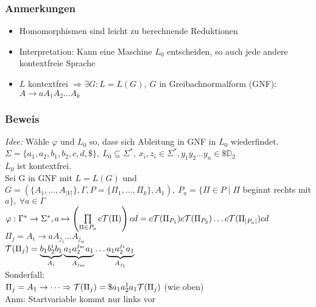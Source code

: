         \subsubsection{Anmerkungen}
            \begin{itemize}
                \item Homomorphismen sind leicht zu berechnende Reduktionen
                \item Interpretation: Kann eine Maschine $L_0$ entscheiden, so auch jede andere kontextfreie Sprache
                \item $L$ kontextfrei $\Rightarrow\exists G:L=L(G),\ G$ in Greibachnormalform (GNF):
                \subitem $A\rightarrow aA_1A_2\dots A_k$
            \end{itemize}
        \subsubsection{Beweis}
            \emph{Idee:} Wähle $\varphi$ und $L_0$ so, dass sich Ableitung in GNF in $L_0$ wiederfindet.\\[0.2cm]
            $\Sigma=\{a_1,a_2,b_1,b_2,c,d,\$\},\ L_0\subseteq \Sigma^*,\ x_i,z_i\in\Sigma^*, y_1y_2\dots y_n\in\$\mathds{D}_2$\\
            $L_0$ ist kontextfrei.\\[0,2cm]
            Sei G in GNF mit $L=L(G)$ und $G=\left(\{A_1,\dots,A_{|V|}\},\Gamma,P=\{\Pi_1,\dots,\Pi_k\},A_1\right),\ P_a=\{\Pi\in P\mid \Pi$ beginnt rechts mit $a\},\ \forall a\in\Gamma$\\
            $\varphi:\Gamma^*\rightarrow\Sigma^*, a\mapsto \left(\prod\limits_{\Pi\in P_a}c\mathcal{T}(\Pi)\right)cd=c\mathcal{T}(\Pi_{P_1})c\mathcal{T}(\Pi_{P_2})\dots c\mathcal{T}(\Pi_{|P_a|})cd$\\
            $\Pi_j=A_i\rightarrow aA_{j_1}\dots A_{j_m}$\\
            $\mathcal{T}(\Pi_j)=\underbrace{b_1b_2^ib_1}_{A_i}\underbrace{a_1a_2^{j_m}a_1}_{A_{j_m}}\dots \underbrace{a_1a_2^{j_1}a_1}_{A_{j_1}}$\\
            Sonderfall:\\
            $\Pi_j=A_1\rightarrow\dots \Rightarrow \mathcal{T}(\Pi_j)=\$a_1a_2^1a_1\mathcal{T}(\Pi_j)$ (wie oben)\\
            Anm: Startvariable kommt nur links vor
